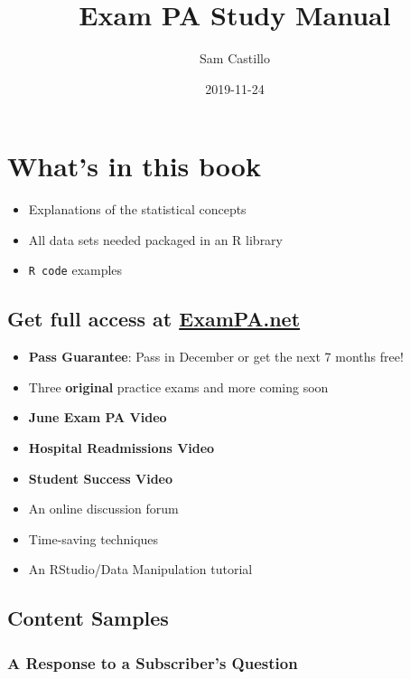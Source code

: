 \documentclass[openany]{book}
\title{Exam PA Study Manual}
\author{Sam Castillo}
\date{2019-11-24}
\providecommand{\tightlist}{%
  \setlength{\itemsep}{0pt}\setlength{\parskip}{0pt}}
\begin{document}
\maketitle

{
\setcounter{tocdepth}{1}
\tableofcontents
}
\hypertarget{whats-in-this-book}{%
\chapter{What's in this book}\label{whats-in-this-book}}

\begin{itemize}
\tightlist
\item
  Explanations of the statistical concepts
\item
  All data sets needed packaged in an R library
\item
  \texttt{R\ code} examples
\end{itemize}

\hypertarget{get-full-access-at-exampa.net}{%
\section{\texorpdfstring{Get full access at \href{https://www.exampa.net/pricing}{ExamPA.net}}{Get full access at ExamPA.net}}\label{get-full-access-at-exampa.net}}

\begin{itemize}
\tightlist
\item
  {\textbf{Pass Guarantee}: Pass in December or get the next 7 months free!}
\item
  Three \textbf{original} practice exams and more coming soon
\item
  \textbf{June Exam PA Video}
\item
  \textbf{Hospital Readmissions Video}
\item
  \textbf{Student Success Video}
\item
  An online discussion forum
\item
  Time-saving techniques
\item
  An RStudio/Data Manipulation tutorial
\end{itemize}

\hypertarget{content-samples}{%
\section{Content Samples}\label{content-samples}}

\hypertarget{a-response-to-a-subscribers-question}{%
\subsection{A Response to a Subscriber's Question}\label{a-response-to-a-subscribers-question}}
\end{document}
